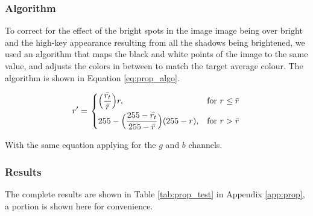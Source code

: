 \subsubsection*{Algorithm}
To correct for the effect of the bright spots in the image image being over bright and the high-key appearance resulting from all the shadows being brightened, we used an algorithm that maps the black and white points of the image to the same value, and adjusts the colors in between to match the target average colour. The algorithm is shown in Equation \ref{eq:prop_algo}.

\begin{equation} \label{eq:prop_algo}
  r' = \left.
  \begin{dcases}
    \displaystyle \Big(\frac{\bar{r_t}}{\bar{r}}\Big)r, & \text{for } r \leq \bar{r} \\
    \displaystyle 255 - 
    \Big(\frac{255 - \bar{r_t}}{255 - \bar{r}}\Big)(255 - r), & \text{for } r > \bar{r} \\
  \end{dcases}
  \right.
\end{equation}

With the same equation applying for the $g$ and $b$ channels.

\subsubsection*{Results}
The complete results are shown in Table \ref{tab:prop_test} in Appendix \ref{app:prop}, a portion is shown here for convenience.

